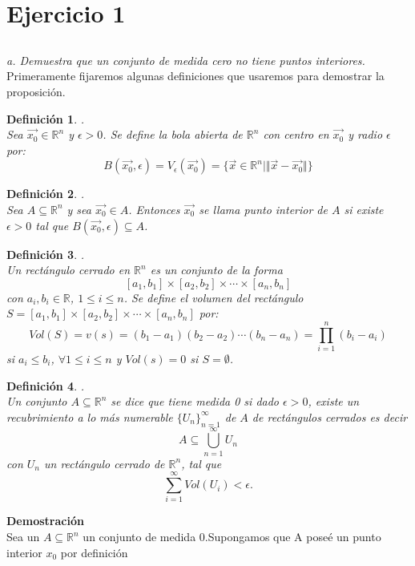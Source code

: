 \documentclass[a4paper,12pt]{article}
\newtheorem{definicion}{Definición}[subsection]
\begin{document}
\section{Ejercicio 1}

\subsection{}
\textit{a. Demuestra que un conjunto de medida cero no tiene puntos interiores.}
Primeramente fijaremos algunas definiciones que usaremos para demostrar la proposición.
\begin{definicion}.\\
Sea  $\vec{x_0} \in \mathbb{R}^n$ y $\epsilon > 0$. Se define la bola abierta de $\mathbb{R}^n$
con centro en $\vec{x_0}$ y radio $\epsilon$ por:
\[B(\vec{x_0},\epsilon) = V_{\epsilon}(\vec{x_0}) =
\lbrace \vec{x} \in \mathbb{R}^n |  \Vert \vec{x} - \vec{x_0} \Vert \rbrace\]
\end{definicion}
\begin{definicion}.\\
Sea $A \subseteq \mathbb{R}^n$ y sea $\vec{x_0} \in A$. Entonces $\vec{x_0}$ se llama punto interior de $A$ si existe
$\epsilon > 0$ tal que $B(\vec{x_0},\epsilon) \subseteq A$.
\end{definicion}
\begin{definicion}.\\
Un rectángulo cerrado en $\mathbb{R}^n$ es un conjunto de la forma
\[[a_1 , b_1] \times [a_2,b_2] \times \cdots \times [a_n,b_n]\]
con $a_i,b_i \in \mathbb{R}$, $1 \leq i \leq n$.
Se define el volumen del rectángulo $S = [a_1 , b_1] \times [a_2,b_2] \times \cdots \times [a_n,b_n]$ por:
\[Vol(S) = v(s) = (b_1 - a_1)(b_2 - a_2)\cdots(b_n - a_n) = \prod_{i = 1}^{n}(b_i - a_i)\]
si $a_i \leq b_i$, $\forall 1 \leq i \leq n$ y $Vol(s) = 0$ si $S = \emptyset$.
\end{definicion}
\begin{definicion}.\\
Un conjunto $A \subseteq \mathbb{R}^n$ se dice que tiene medida 0 si dado $\epsilon > 0$, existe un recubrimiento a lo
más numerable $\lbrace U_n \rbrace_{n = 1}^{\infty}$ de $A$ de rectángulos cerrados es decir
\[A \subseteq  \bigcup_{n = 1}^{\infty} U_n\]
con $U_n$ un rectángulo cerrado de $\mathbb{R}^n$, tal que
\[\sum_{i = 1}^{\infty} Vol(U_i) < \epsilon. \]
\end{definicion}
\textbf{Demostración}\\
Sea un $A \subseteq \mathbb{R}^n$ un conjunto de medida 0.Supongamos que A poseé un punto interior $x_0$ por definición
\end{document}
